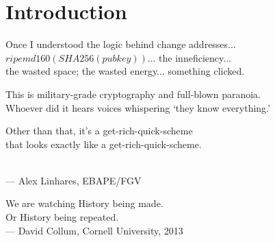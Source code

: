 




\chapter{Introduction}



\bigskip

\begin{flushright}{\slshape
    {Once I understood the logic behind change addresses...\\
    $ripemd160( SHA256( pubkey ) )$... the inneficiency... \\
    the wasted space; the wasted energy... something clicked.\\
    \medskip

    This is military-grade cryptography and full-blown paranoia.\\
    Whoever did it hears voices whispering `they know everything.' \\
    \medskip

    Other than that, it's a get-rich-quick-scheme \\
    that looks exactly like a get-rich-quick-scheme.}
	\\ \medskip
    --- Alex Linhares, EBAPE/FGV

        \bigskip
        \bigskip
        \bigskip
        \bigskip

    {We are watching History being made.\\
    Or History being repeated.}
	\\ \medskip
    --- David Collum, Cornell University, 2013}
\end{flushright}
\bigskip
\bigskip
\bigskip
\bigskip

